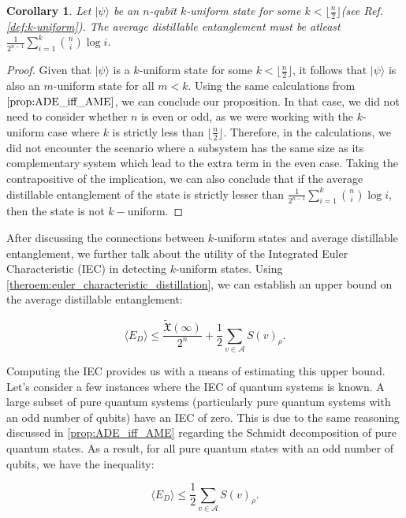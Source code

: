 \documentclass{article}
\newtheorem{corollary}[theorem]{Corollary}
\newcommand{\ket}[1]{|#1\rangle}
\begin{document}
\begin{corollary}
\label{corollary:lower_bound_of_k-uniform}
    Let $\ket{\psi}$ be an $n$-qubit $k$-uniform state for some $k < \lfloor \frac{n}{2} \rfloor$(see Ref. \ref{def:k-uniform}). The average distillable entanglement must be atleast $\frac{1}{2^{n-1}} \sum_{i=1}^{k} \binom{n}{i} \log i$.
\end{corollary}
\begin{proof}
Given that $\ket{\psi}$ is a $k$-uniform state for some $k < \lfloor \frac{n}{2} \rfloor$, it follows that $\ket{\psi}$ is also an $m$-uniform state for all $m < k$. Using the same calculations from $\ref{prop:ADE_iff_AME}$, we can conclude our proposition. In that case, we did not need to consider whether $n$ is even or odd, as we were working with the $k$-uniform case where $k$ is strictly less than $\lfloor \frac{n}{2} \rfloor$. Therefore, in the calculations, we did not encounter the scenario where a subsystem has the same size as its complementary system which lead to the extra term in the even case. Taking the contrapositive of the implication, we can also conclude that if the average distillable entanglement of the state is strictly lesser than $\frac{1}{2^{n-1}} \sum_{i=1}^{k} \binom{n}{i} \log i$, then the state is not $k-$uniform.
\end{proof}

After discussing the connections between $k$-uniform states and average distillable entanglement, we further talk about the utility of the Integrated Euler Characteristic (IEC) in detecting $k$-uniform states. Using \ref{theroem:euler_characteristic_distillation}, we can establish an upper bound on the average distillable entanglement:

\begin{equation}    
\langle E_D \rangle \leq \frac{\tilde{\mathfrak{X}}(\infty)}{2^n} + \frac{1}{2} \sum_{v \in \mathcal{A}}  S(v)_{\rho}.
\end{equation}


Computing the IEC provides us with a means of estimating this upper bound. Let's consider a few instances where the IEC of quantum systems is known. A large subset of pure quantum systems (particularly pure quantum systems with an odd number of qubits) have an IEC of zero. This is due to the same reasoning discussed in \ref{prop:ADE_iff_AME} regarding the Schmidt decomposition of pure quantum states. As a result, for all pure quantum states with an odd number of qubits, we have the inequality:

\begin{equation}
\label{eq:ADE_leq_correlation}
\langle E_D \rangle \leq \frac{1}{2} \sum_{v \in \mathcal{A}}  S(v)_{\rho}.
\end{equation}
\end{document}
